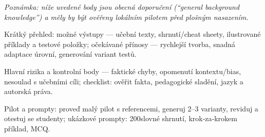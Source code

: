 \noindent\textit{Poznámka: níže uvedené body jsou obecná doporučení (``general background knowledge'') a měly by být ověřeny lokálním pilotem před plošným nasazením.}\medskip

Krátký přehled: možné výstupy — učební texty, shrnutí/cheat sheety, ilustrované příklady a testové položky; očekávané přínosy — rychlejší tvorba, snadná adaptace úrovní, generování variant testů.

Hlavní rizika a kontrolní body — faktické chyby, opomenutí kontextu/bias, nesoulad s učebními cíli; checklist: ověřit fakta, pedagogické sladění, jazyk a autorská práva.

Pilot a prompty: proveď malý pilot s referencemi, generuj 2–3 varianty, reviduj a otestuj se studenty; ukázkové prompty: 200slovné shrnutí, krok‑za‑krokem příklad, MCQ.